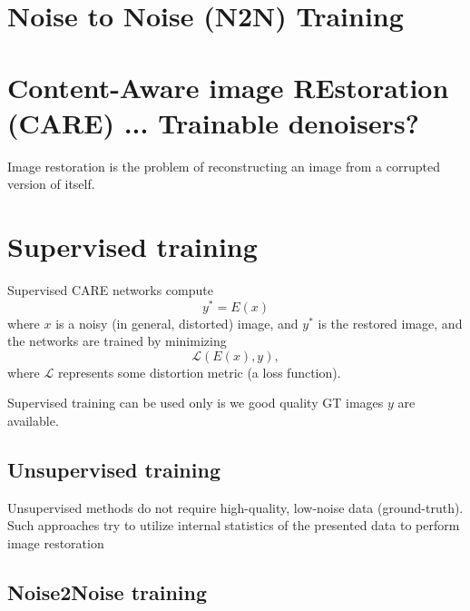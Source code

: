 \chapter{Noise to Noise (N2N) Training}
\chapter{Content-Aware image REstoration (CARE) ... Trainable denoisers?}

Image restoration is the problem of reconstructing an image from a corrupted version of itself. %

\chapter{Supervised training}

Supervised CARE networks compute
\begin{equation}
  y^* = E(x)
\end{equation}
where $x$ is a noisy (in general, distorted) image, and $y^*$ is the restored image, and the networks are trained by minimizing
\begin{equation}
  \mathcal{L}(E(x), y),
\end{equation}
where $\mathcal{L}$ represents some distortion metric (a loss
function). %

Supervised training can be used only is we good quality GT images $y$
are
available. %

\section{Unsupervised training}

Unsupervised methods do not require high-quality, low-noise data
(ground-truth).  Such approaches try to utilize internal statistics of
the presented data to perform image
restoration %

\section{Noise2Noise training}


